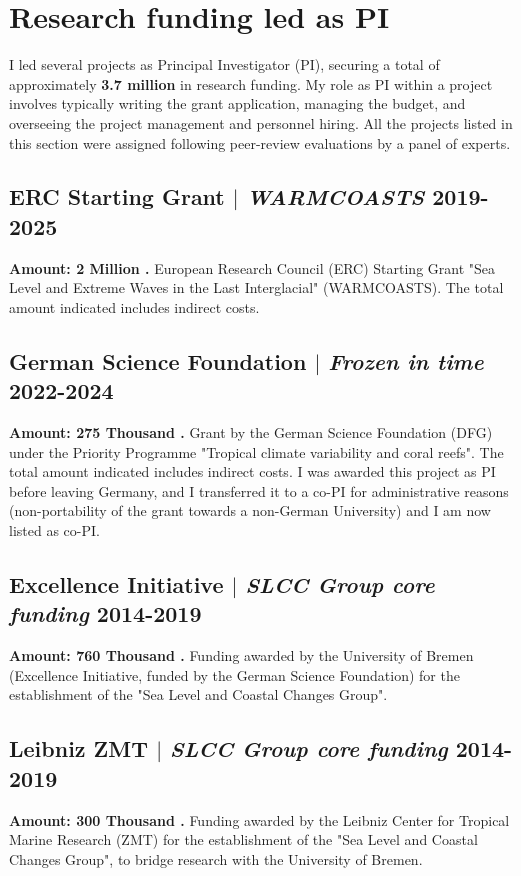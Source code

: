 \documentclass[11pt]{article}
\begin{document}
\newpage

\section{Research funding led as PI}
{\normalfont I led several projects as Principal Investigator (PI), securing a total of approximately \textbf{3.7 million \texteuro} in research funding. My role as PI within a project involves typically writing the grant application, managing the budget, and overseeing the project management and personnel hiring. All the projects listed in this section were assigned following peer-review evaluations by a panel of experts.}\\
\bigskip

\subsection{ERC Starting Grant  $|$ {\normalfont\textit{WARMCOASTS}} \hfill 2019-2025}
{\footnotesize \textbf{Amount: 2 Million \texteuro.} European Research Council (ERC) Starting Grant "Sea Level and Extreme Waves in the Last Interglacial" (WARMCOASTS). The total amount indicated includes indirect costs.}
\bigskip

\subsection{German Science Foundation  $|$ {\normalfont\textit{Frozen in time}} \hfill 2022-2024}
{\footnotesize \textbf{Amount: 275 Thousand \texteuro.} Grant by the German Science Foundation (DFG) under the Priority Programme "Tropical climate variability and coral reefs". The total amount indicated includes indirect costs. I was awarded this project as PI before leaving Germany, and I transferred it to a co-PI for administrative reasons (non-portability of the grant towards a non-German University) and I am now listed as co-PI.}
\bigskip

\subsection{Excellence Initiative  $|$ {\normalfont\textit{SLCC Group core funding}} \hfill 2014-2019}
{\footnotesize \textbf{Amount: 760 Thousand \texteuro.} Funding awarded by the University of Bremen (Excellence Initiative, funded by the German Science Foundation) for the establishment of the "Sea Level and Coastal Changes Group".}
\bigskip

\subsection{Leibniz ZMT  $|$ {\normalfont\textit{SLCC Group  core funding}} \hfill 2014-2019}
{\footnotesize \textbf{Amount: 300 Thousand \texteuro.} Funding awarded by the Leibniz Center for Tropical Marine Research (ZMT) for the establishment of the "Sea Level and Coastal Changes Group", to bridge research with the University of Bremen.}
\bigskip
\end{document}
